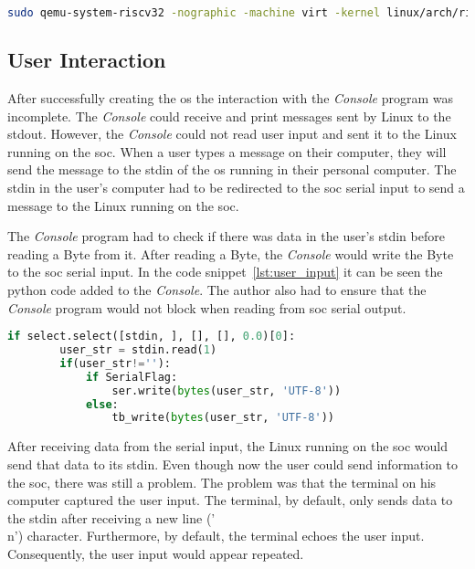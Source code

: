 \begin{lstlisting}[language=bash, caption={\acrlong{rootfs} \textit{QEMU} simulation.}, label=lst:qemu_rootfs]
sudo qemu-system-riscv32 -nographic -machine virt -kernel linux/arch/riscv/boot/Image -append "root=/dev/ram init=/init ro console=ttyS0" -initrd rootfs.cpio.gz -bios default
\end{lstlisting}

\subsection{User Interaction}
After successfully creating the \acrlong{os} the interaction with the \textit{Console} program was incomplete. The \textit{Console} could receive and print messages sent by Linux to the stdout. However, the \textit{Console} could not read user input and sent it to the Linux running on the \acrshort{soc}. When a user types a message on their computer, they will send the message to the stdin of the \acrshort{os} running in their personal computer. The stdin in the user's computer had to be redirected to the \acrshort{soc} serial input to send a message to the Linux running on the \acrshort{soc}.

The \textit{Console} program had to check if there was data in the user's stdin before reading a Byte from it. After reading a Byte, the \textit{Console} would write the Byte to the \acrshort{soc} serial input. In the code snippet~\ref{lst:user_input} it can be seen the python code added to the \textit{Console}. The author also had to ensure that the \textit{Console} program would not block when reading from \acrshort{soc} serial output.

\begin{lstlisting}[language=Python, caption={Read user input and send to the \acrshort{soc}.}, label=lst:user_input]
    if select.select([stdin, ], [], [], 0.0)[0]:
        user_str = stdin.read(1)
        if(user_str!=''):
            if SerialFlag:
                ser.write(bytes(user_str, 'UTF-8'))
            else:
                tb_write(bytes(user_str, 'UTF-8'))
\end{lstlisting}

After receiving data from the serial input, the Linux running on the \acrshort{soc} would send that data to its stdin. Even though now the user could send information to the \acrshort{soc}, there was still a problem. The problem was that the terminal on his computer captured the user input. The terminal, by default, only sends data to the stdin after receiving a new line ('\\n') character. Furthermore, by default, the terminal echoes the user input. Consequently, the user input would appear repeated.

